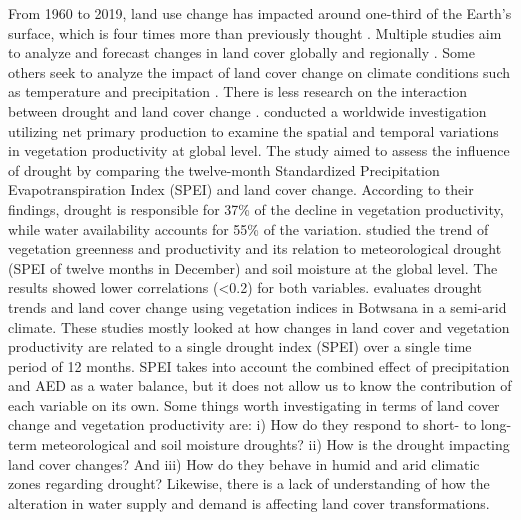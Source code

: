 \documentclass[
  authoryear,
  preprint,
  3p,
  onecolumn]{elsarticle}
\begin{document}
From 1960 to 2019, land use change has impacted around one-third of the
Earth's surface, which is four times more than previously thought
\citep{Winkler2021}. Multiple studies aim to analyze and forecast
changes in land cover globally \citep{Winkler2021, Song2018} and
regionally \citep{Chamling2020, Homer2020, Yang2021}. Some others seek
to analyze the impact of land cover change on climate conditions such as
temperature and precipitation \citep{Luyssaert2014, Pitman2012}. There
is less research on the interaction between drought and land cover
change \citep{Chen2022, Akinyemi2021, Peng2017}. \citet{Peng2017}
conducted a worldwide investigation utilizing net primary production to
examine the spatial and temporal variations in vegetation productivity
at global level. The study aimed to assess the influence of drought by
comparing the twelve-month Standardized Precipitation Evapotranspiration
Index (SPEI) and land cover change. According to their findings, drought
is responsible for 37\% of the decline in vegetation productivity, while
water availability accounts for 55\% of the variation. \citet{Chen2022}
studied the trend of vegetation greenness and productivity and its
relation to meteorological drought (SPEI of twelve months in December)
and soil moisture at the global level. The results showed lower
correlations (\textless0.2) for both variables. \citet{Akinyemi2021}
evaluates drought trends and land cover change using vegetation indices
in Botwsana in a semi-arid climate. These studies mostly looked at how
changes in land cover and vegetation productivity are related to a
single drought index (SPEI) over a single time period of 12 months. SPEI
takes into account the combined effect of precipitation and AED as a
water balance, but it does not allow us to know the contribution of each
variable on its own. Some things worth investigating in terms of land
cover change and vegetation productivity are: i) How do they respond to
short- to long-term meteorological and soil moisture droughts? ii) How
is the drought impacting land cover changes? And iii) How do they behave
in humid and arid climatic zones regarding drought? Likewise, there is a
lack of understanding of how the alteration in water supply and demand
is affecting land cover transformations.
\end{document}
